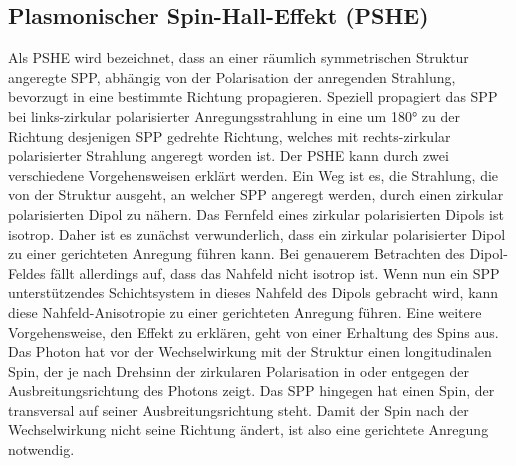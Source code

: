 \documentclass[titlepage]{article}
\begin{document}
	\subsection{Plasmonischer Spin-Hall-Effekt (PSHE)}
	Als PSHE wird bezeichnet, dass an einer räumlich symmetrischen Struktur angeregte SPP, abhängig von der Polarisation der anregenden Strahlung, bevorzugt in eine bestimmte Richtung propagieren. Speziell propagiert das SPP bei links-zirkular polarisierter Anregungsstrahlung in eine um 180° zu der Richtung desjenigen SPP gedrehte Richtung, welches mit rechts-zirkular polarisierter Strahlung angeregt worden ist. Der PSHE kann durch zwei verschiedene Vorgehensweisen erklärt werden. Ein Weg ist es, die Strahlung, die von der Struktur ausgeht, an welcher SPP angeregt werden, durch einen zirkular polarisierten Dipol zu nähern. Das Fernfeld eines zirkular polarisierten Dipols ist isotrop. Daher ist es zunächst verwunderlich, dass ein zirkular polarisierter Dipol zu einer gerichteten Anregung führen kann. Bei genauerem Betrachten des Dipol-Feldes fällt allerdings auf, dass das Nahfeld nicht isotrop ist. Wenn nun ein SPP unterstützendes Schichtsystem in dieses Nahfeld des Dipols gebracht wird, kann diese Nahfeld-Anisotropie zu einer gerichteten Anregung führen.
	Eine weitere Vorgehensweise, den Effekt zu erklären, geht von einer Erhaltung des Spins aus. Das Photon hat vor der Wechselwirkung mit der Struktur einen longitudinalen Spin, der je nach Drehsinn der zirkularen Polarisation in oder entgegen der Ausbreitungsrichtung des Photons zeigt. Das SPP hingegen hat einen Spin, der transversal auf seiner Ausbreitungsrichtung steht. Damit der Spin nach der Wechselwirkung nicht seine Richtung ändert, ist also eine gerichtete Anregung notwendig.
\end{document}
